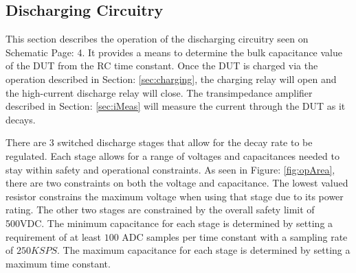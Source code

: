 \subsection{Discharging Circuitry}

This section describes the operation of the discharging circuitry seen on Schematic Page: 4. It provides a means to determine the bulk capacitance value of the DUT from the RC time constant. Once the DUT is charged via the operation described in Section: \ref{sec:charging}, the charging relay will open and the high-current discharge relay will close. The transimpedance amplifier described in Section: \ref{sec:iMeas} will measure the current through the DUT as it decays.

There are 3 switched discharge stages that allow for the decay rate to be regulated. Each stage allows for a range of voltages and capacitances needed to stay within safety and operational constraints. As seen in Figure: \ref{fig:opArea}, there are two constraints on both the voltage and capacitance. The lowest valued resistor constrains the maximum voltage when using that stage due to its power rating. The other two stages are constrained by the overall safety limit of 500VDC. The minimum capacitance for each stage is determined by setting a requirement of at least $100$ ADC samples per time constant with a sampling rate of $250KSPS$. The maximum capacitance for each stage is determined by setting a maximum time constant.



